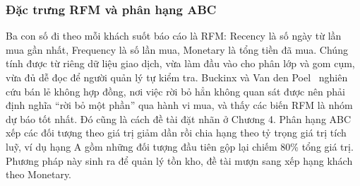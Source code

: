 \subsubsection{Đặc trưng RFM và phân hạng ABC}\label{sec:rfmabc}
Ba con số đi theo mỗi khách suốt báo cáo là RFM: Recency là số ngày từ lần mua gần nhất, Frequency là số lần mua, Monetary là tổng tiền đã mua. Chúng tính được từ riêng dữ liệu giao dịch, vừa làm đầu vào cho phân lớp và gom cụm, vừa đủ dễ đọc để người quản lý tự kiểm tra. Buckinx và Van den Poel~\cite{buckinx2005} nghiên cứu bán lẻ không hợp đồng, nơi việc rời bỏ hẳn không quan sát được nên phải định nghĩa ``rời bỏ một phần'' qua hành vi mua, và thấy các biến RFM là nhóm dự báo tốt nhất. Đó cũng là cách đề tài đặt nhãn ở Chương 4. Phân hạng ABC~\cite{flores1986} xếp các đối tượng theo giá trị giảm dần rồi chia hạng theo tỷ trọng giá trị tích luỹ, ví dụ hạng A gồm những đối tượng đầu tiên gộp lại chiếm 80\% tổng giá trị. Phương pháp này sinh ra để quản lý tồn kho, đề tài mượn sang xếp hạng khách theo Monetary.
